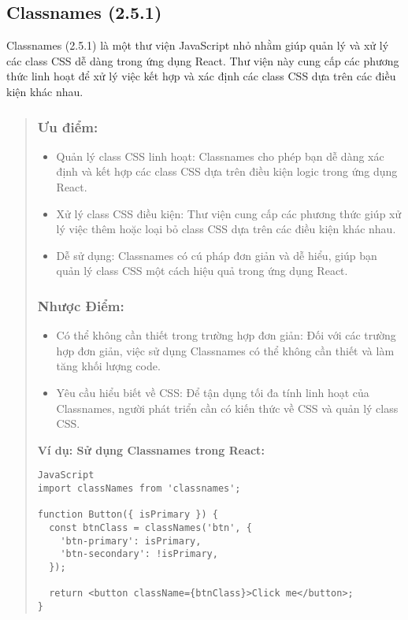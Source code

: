 \subsection{Classnames (2.5.1)}
Classnames (2.5.1) là một thư viện JavaScript nhỏ nhằm giúp quản lý và xử lý các class CSS dễ dàng trong ứng dụng React. Thư viện này cung cấp các phương thức linh hoạt để xử lý việc kết hợp và xác định các class CSS dựa trên các điều kiện khác nhau.

\begin{quote}
\subsubsection{Ưu điểm:}
\begin{itemize}
  \item Quản lý class CSS linh hoạt: Classnames cho phép bạn dễ dàng xác định và kết hợp các class CSS dựa trên điều kiện logic trong ứng dụng React.
  \item Xử lý class CSS điều kiện: Thư viện cung cấp các phương thức giúp xử lý việc thêm hoặc loại bỏ class CSS dựa trên các điều kiện khác nhau.
  \item Dễ sử dụng: Classnames có cú pháp đơn giản và dễ hiểu, giúp bạn quản lý class CSS một cách hiệu quả trong ứng dụng React.
\end{itemize}

\subsubsection{Nhược Điểm:}
\begin{itemize}
  \item Có thể không cần thiết trong trường hợp đơn giản: Đối với các trường hợp đơn giản, việc sử dụng Classnames có thể không cần thiết và làm tăng khối lượng code.
  \item Yêu cầu hiểu biết về CSS: Để tận dụng tối đa tính linh hoạt của Classnames, người phát triển cần có kiến thức về CSS và quản lý class CSS.
\end{itemize}

\textbf{Ví dụ: Sử dụng Classnames trong React:}
\begin{lstlisting}
JavaScript
import classNames from 'classnames';

function Button({ isPrimary }) {
  const btnClass = classNames('btn', {
    'btn-primary': isPrimary,
    'btn-secondary': !isPrimary,
  });

  return <button className={btnClass}>Click me</button>;
}
\end{lstlisting}
\end{quote}



